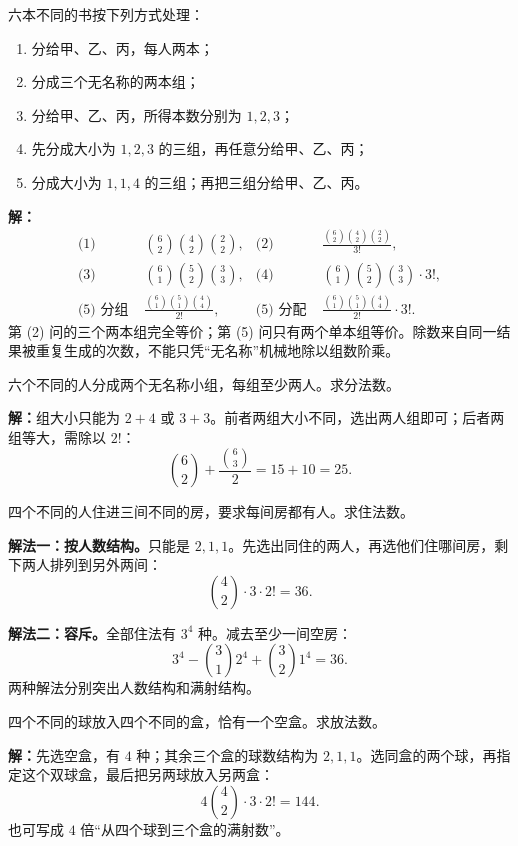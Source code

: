 \begin{examplebox}
  六本不同的书按下列方式处理：
  \begin{enumerate}
    \item 分给甲、乙、丙，每人两本；
    \item 分成三个无名称的两本组；
    \item 分给甲、乙、丙，所得本数分别为 $1,2,3$；
    \item 先分成大小为 $1,2,3$ 的三组，再任意分给甲、乙、丙；
    \item 分成大小为 $1,1,4$ 的三组；再把三组分给甲、乙、丙。
  \end{enumerate}

  \textbf{解：}
  \begin{align*}
    \text{(1) }&\binom62\binom42\binom22,
    &\text{(2) }&\frac{\binom62\binom42\binom22}{3!},\\
    \text{(3) }&\binom61\binom52\binom33,
    &\text{(4) }&\binom61\binom52\binom33\cdot3!,\\
    \text{(5) 分组 }&\frac{\binom61\binom51\binom44}{2!},
    &\text{(5) 分配 }&\frac{\binom61\binom51\binom44}{2!}\cdot3!.
  \end{align*}
  第 (2) 问的三个两本组完全等价；第 (5) 问只有两个单本组等价。除数来自同一结果被重复生成的次数，不能只凭“无名称”机械地除以组数阶乘。
\end{examplebox}

\begin{examplebox}
  六个不同的人分成两个无名称小组，每组至少两人。求分法数。

  \textbf{解：}组大小只能为 $2+4$ 或 $3+3$。前者两组大小不同，选出两人组即可；后者两组等大，需除以 $2!$：
  \[
    \binom62+\frac{\binom63}{2}=15+10=25.
  \]
\end{examplebox}

\begin{examplebox}
  四个不同的人住进三间不同的房，要求每间房都有人。求住法数。

  \textbf{解法一：按人数结构。}只能是 $2,1,1$。先选出同住的两人，再选他们住哪间房，剩下两人排列到另外两间：
  \[
    \binom42\cdot3\cdot2!=36.
  \]

  \textbf{解法二：容斥。}全部住法有 $3^4$ 种。减去至少一间空房：
  \[
    3^4-\binom31 2^4+\binom32 1^4=36.
  \]
  两种解法分别突出人数结构和满射结构。
\end{examplebox}

\begin{examplebox}
  四个不同的球放入四个不同的盒，恰有一个空盒。求放法数。

  \textbf{解：}先选空盒，有 $4$ 种；其余三个盒的球数结构为 $2,1,1$。选同盒的两个球，再指定这个双球盒，最后把另两球放入另两盒：
  \[
    4\binom42\cdot3\cdot2!=144.
  \]
  也可写成 $4$ 倍“从四个球到三个盒的满射数”。
\end{examplebox}

